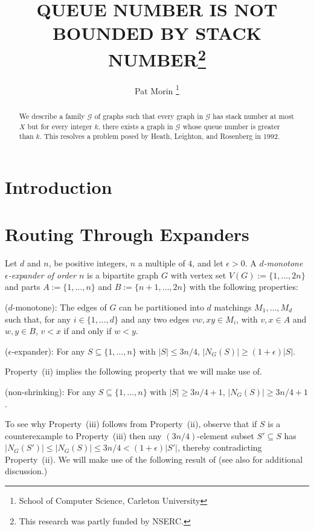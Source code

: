 \documentclass{patmorin}
\title{\MakeUppercase{Queue number is not bounded by stack number}\thanks{This research was partly funded by NSERC.}}
\author{Pat Morin%
    \thanks{School of Computer Science, Carleton University}}
\date{}
\begin{document}
\maketitle

\begin{abstract}
    We describe a family $\mathcal{G}$ of graphs such that every graph in $\mathcal{G}$ has stack number at most $X$ but for every integer $k$, there exists a graph in $\mathcal{G}$ whose queue number is greater than $k$.  This resolves a problem posed by Heath, Leighton, and Rosenberg in 1992.
\end{abstract}

%



\section{Introduction}



\section{Routing Through Expanders}
\label{expander_construction}

Let $d$ and $n$, be positive integers, $n$ a multiple of $4$, and let $\epsilon>0$. A  \emph{$d$-monotone $\epsilon$-expander of order $n$} is a bipartite graph $G$ with vertex set $V(G):=\{1,\ldots,2n\}$ and parts $A:=\{1,\ldots,n\}$ and $B:=\{n+1,\ldots,2n\}$ with the following properties:
\begin{compactenum}[(i)]
  \item ($d$-monotone): The edges of $G$ can be partitioned into $d$ matchings $M_1,\ldots,M_d$ such that, for any $i\in\{1,\ldots,d\}$ and any two edges $vw,xy\in M_i$, with $v,x\in A$ and $w,y\in B$, $v < x$ if and only if $w < y$.
  \item ($\epsilon$-expander): For any $S\subseteq\{1,\ldots,n\}$ with $|S|\le 3n/4$, $|N_G(S)|\ge (1+\epsilon)|S|$.
\end{compactenum}

Property~(ii) implies the following property that we will make use of.
\begin{compactenum}[(i)]\setcounter{enumi}{2}
  \item (non-shrinking): For any $S\subseteq\{1,\ldots,n\}$ with $|S|\ge 3n/4+1$, $|N_G(S)|\ge 3n/4+1$.
\end{compactenum}
To see why Property~(iii) follows from Property~(ii), observe that if $S$ is a counterexample to Property~(iii) then any $(3n/4)$-element subset $S'\subseteq S$ has $|N_G(S')|\le |N_G(S)| \le 3n/4 < (1+\epsilon)|S'|$, thereby contradicting Property~(ii).  We will make use of the following result of \cite{bourgain:X,bourgain.yehudahoff:X} (see also \citet{XX} for additional discussion.)
\end{document}
